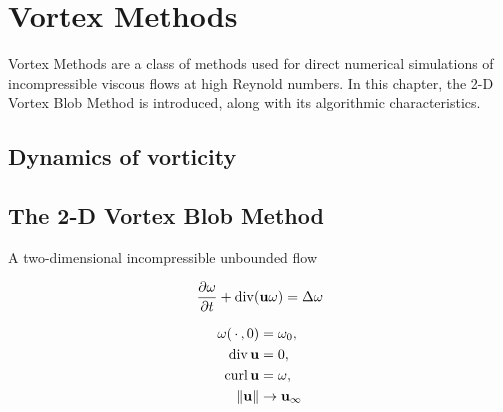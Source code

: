 \chapter{Vortex Methods}
\label{ch:vm}

Vortex Methods are a class of methods used for direct numerical simulations of
incompressible viscous flows at high Reynold numbers.  In this chapter, the 2-D
Vortex Blob Method is introduced, along with its algorithmic characteristics.

\section{Dynamics of vorticity}

\section{The 2-D Vortex Blob Method}

A two-dimensional incompressible unbounded flow


\begin{equation}
  \label{eq:vort-vel-ns}
  \frac{\partial\omega}{\partial t} + \operatorname{div}(\mathbf{u}\omega) = \Delta\omega
\end{equation}

\begin{align}
  \omega(\,\cdot\,{}, 0) &= \omega_0, \\
  \operatorname{div}\mathbf{u} &= 0, \\
  \operatorname{curl}\mathbf{u} &= \omega, \\
  \lVert\mathbf{u}\rVert &\to\mathbf{u}_\infty
\end{align}
